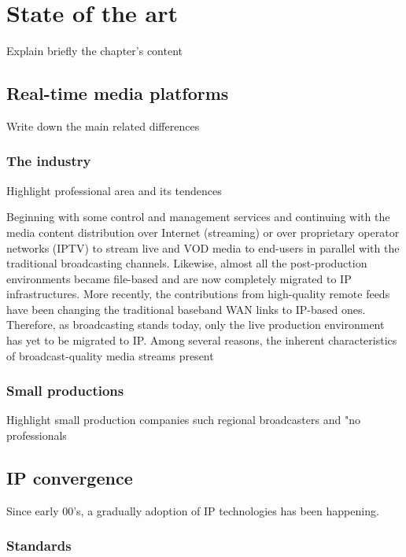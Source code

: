 \chapter{State of the art}\label{A:stateOfTheArt}

Explain briefly the chapter's content 

\section{Real-time media platforms}

Write down the main related differences

\subsection{The industry}

Highlight professional area and its tendences



Beginning with some control and management services and continuing with the media content
distribution over Internet (streaming) or over proprietary operator networks (IPTV) to stream live and
VOD media to end-users in parallel with the traditional broadcasting channels. Likewise, almost all
the post-production environments became file-based and are now completely migrated to IP
infrastructures. More recently, the contributions from high-quality remote feeds have been changing
the traditional baseband WAN links to IP-based ones.
Therefore, as broadcasting stands today, only the live production environment has yet to be migrated
to IP. Among several reasons, the inherent characteristics of broadcast-quality media streams present

\subsection{Small productions}

Highlight small production companies such regional broadcasters and "no professionals


\section{IP convergence}

Since early 00’s, a gradually adoption of IP technologies has been happening.

\subsection{Standards}


